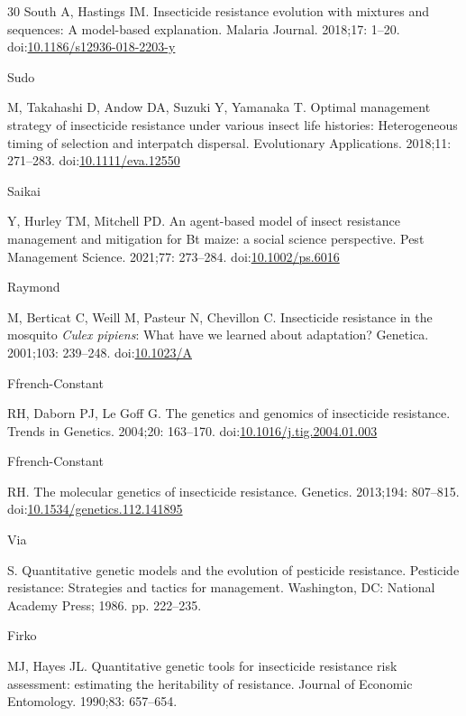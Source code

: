 \documentclass[10pt,letterpaper]{article}
\begin{document}
\begin{thebibliography}{30}
\hypertarget{ref-South2018}{South} A, Hastings IM. {Insecticide resistance evolution with mixtures and sequences: A model-based explanation}. Malaria Journal. 2018;17: 1--20. doi:\href{https://doi.org/10.1186/s12936-018-2203-y}{10.1186/s12936-018-2203-y}

\hypertarget{ref-Sudo2018}{Sudo} M, Takahashi D, Andow DA, Suzuki Y, Yamanaka T. {Optimal management strategy of insecticide resistance under various insect life histories: Heterogeneous timing of selection and interpatch dispersal}. Evolutionary Applications. 2018;11: 271--283. doi:\href{https://doi.org/10.1111/eva.12550}{10.1111/eva.12550}

\hypertarget{ref-Saikai2021}{Saikai} Y, Hurley TM, Mitchell PD. {An agent-based model of insect resistance management and mitigation for Bt maize: a social science perspective}. Pest Management Science. 2021;77: 273--284. doi:\href{https://doi.org/10.1002/ps.6016}{10.1002/ps.6016}

\hypertarget{ref-Raymond2001}{Raymond} M, Berticat C, Weill M, Pasteur N, Chevillon C. {Insecticide resistance in the mosquito \textit{Culex pipiens}: What have we learned about adaptation?} Genetica. 2001;103: 239--248. doi:\href{https://doi.org/10.1023/A}{10.1023/A}

\hypertarget{ref-Ffrench-Constant2004}{Ffrench-Constant} RH, Daborn PJ, Le Goff G. {The genetics and genomics of insecticide resistance}. Trends in Genetics. 2004;20: 163--170. doi:\href{https://doi.org/10.1016/j.tig.2004.01.003}{10.1016/j.tig.2004.01.003}

\hypertarget{ref-Ffrench-Constant2013}{Ffrench-Constant} RH. {The molecular genetics of insecticide resistance}. Genetics. 2013;194: 807--815. doi:\href{https://doi.org/10.1534/genetics.112.141895}{10.1534/genetics.112.141895}

\hypertarget{ref-Via1986}{Via} S. {Quantitative genetic models and the evolution of pesticide resistance}. Pesticide resistance: Strategies and tactics for management. Washington, DC: National Academy Press; 1986. pp. 222--235.

\hypertarget{ref-Firko1990}{Firko} MJ, Hayes JL. {Quantitative genetic tools for insecticide resistance risk assessment: estimating the heritability of resistance}. Journal of Economic Entomology. 1990;83: 657--654.


\end{thebibliography}
\end{document}
